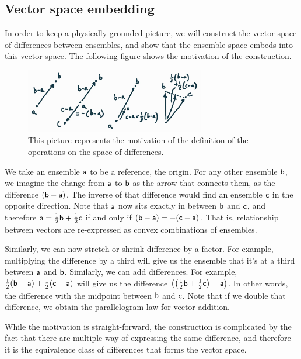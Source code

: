 \subsection{Vector space embedding}

In order to keep a physically grounded picture, we will construct the vector space of differences between ensembles, and show that the ensemble space embeds into this vector space. The following figure shows the motivation of the construction.

\begin{figure}[H]
	\centering
	\includegraphics[width=0.7\textwidth]{tempimages/EnsembleDifferences.jpg}
	\caption{This picture represents the motivation of the definition of the operations on the space of differences.}
\end{figure}

We take an ensemble $\ens[a]$ to be a reference, the origin. For any other ensemble $\ens[b]$, we imagine the change from $\ens[a]$ to $\ens[b]$ as the arrow that connects them, as the difference $(\ens[b] - \ens[a])$. The inverse of that difference would find an ensemble $\ens[c]$ in the opposite direction. Note that $\ens[a]$ now sits exactly in between $\ens[b]$ and $\ens[c]$, and therefore $\ens[a] = \frac{1}{2}\ens[b] + \frac{1}{2}\ens[c]$ if and only if $(\ens[b] - \ens[a]) = - (\ens[c]- \ens[a])$. That is, relationship between vectors are re-expressed as convex combinations of ensembles.

Similarly, we can now stretch or shrink difference by a factor. For example, multiplying the difference by a third will give us the ensemble that it's at a third between $\ens[a]$ and $\ens[b]$. Similarly, we can add differences. For example, $\frac{1}{2}(\ens[b] - \ens[a]) + \frac{1}{2}(\ens[c] - \ens[a])$ will give us the difference $\left(\left(\frac{1}{2}\ens[b] + \frac{1}{2}\ens[c]\right) - \ens[a]\right)$. In other words, the difference with the midpoint between $\ens[b]$ and $\ens[c]$. Note that if we double that difference, we obtain the parallelogram law for vector addition.

While the motivation is straight-forward, the construction is complicated by the fact that there are multiple way of expressing the same difference, and therefore it is the equivalence class of differences that forms the vector space.

